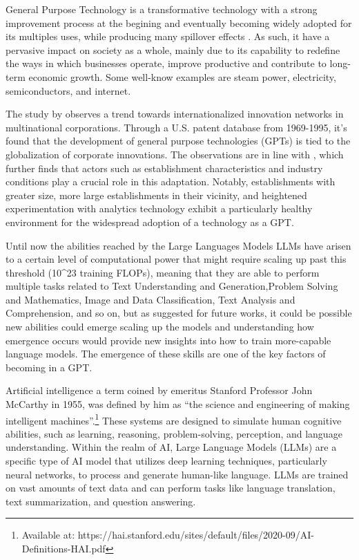 \documentclass[preprint, 3p,
authoryear]{elsarticle} %
\begin{document}
General Purpose Technology is a transformative technology with a strong
improvement process at the begining and eventually becoming widely
adopted for its multiples uses, while producing many spillover effects
\citep{paradox}. As such, it have a pervasive impact on society as a
whole, mainly due to its capability to redefine the ways in which
businesses operate, improve productive and contribute to long-term
economic growth. Some well-know examples are steam power, electricity,
semiconductors, and internet.

The study by \citep{Qiu2018TheIG} observes a trend towards
internationalized innovation networks in multinational corporations.
Through a U.S. patent database from 1969-1995, it's found that the
development of general purpose technologies (GPTs) is tied to the
globalization of corporate innovations. The observations are in line
with \citep{Chen2021HowDL}, which further finds that actors such as
establishment characteristics and industry conditions play a crucial
role in this adaptation. Notably, establishments with greater size, more
large establishments in their vicinity, and heightened experimentation
with analytics technology exhibit a particularly healthy environment for
the widespread adoption of a technology as a GPT.

Until now the abilities reached by the Large Languages Models LLMs have
arisen to a certain level of computational power that might require
scaling up past this threshold (10\^{}23 training FLOPs), meaning that
they are able to perform multiple tasks related to Text Understanding
and Generation,Problem Solving and Mathematics, Image and Data
Classification, Text Analysis and Comprehension, and so on, but as
\citep{weiemergent} suggested for future works, it could be possible new
abilities could emerge scaling up the models and understanding how
emergence occurs would provide new insights into how to train
more-capable language models. The emergence of these skills are one of
the key factors of becoming in a GPT.

Artificial intelligence a term coined by emeritus Stanford Professor
John McCarthy in 1955, was defined by him as ``the science and
engineering of making intelligent machines''.\footnote{Available at:
  https://hai.stanford.edu/sites/default/files/2020-09/AI-Definitions-HAI.pdf}
These systems are designed to simulate human cognitive abilities, such
as learning, reasoning, problem-solving, perception, and language
understanding. Within the realm of AI, Large Language Models (LLMs) are
a specific type of AI model that utilizes deep learning techniques,
particularly neural networks, to process and generate human-like
language. LLMs are trained on vast amounts of text data and can perform
tasks like language translation, text summarization, and question
answering.
\end{document}
